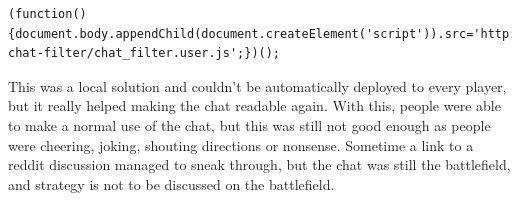 \documentclass[a4paper]{article}
\begin{document}
\begin{lstlisting}
(function(){document.body.appendChild(document.createElement('script')).src='http://jpgohlke.github.io/twitch-chat-filter/chat_filter.user.js';})();
\end{lstlisting}

This was a local solution and couldn't be automatically deployed to every player, but it really helped making the chat readable again. With this, people were able to make a normal use of the chat, but this was still not good enough as people were cheering, joking, shouting directions or nonsense. Sometime a link to a reddit discussion managed to sneak through, but the chat was still the battlefield, and strategy is not to be discussed on the battlefield.
\end{document}
